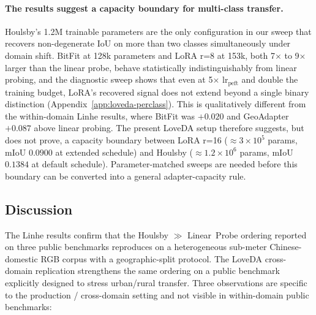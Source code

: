 \paragraph{The results suggest a capacity boundary for multi-class transfer.} Houlsby's 1.2M trainable parameters are the only configuration in our sweep that recovers non-degenerate IoU on more than two classes simultaneously under domain shift. BitFit at 128k parameters and LoRA r=8 at 153k, both 7$\times$ to 9$\times$ larger than the linear probe, behave statistically indistinguishably from linear probing, and the diagnostic sweep shows that even at 5$\times$ lr$_{\mathrm{peft}}$ and double the training budget, LoRA's recovered signal does not extend beyond a single binary distinction (Appendix~\ref{app:loveda-perclass}). This is qualitatively different from the within-domain Linhe results, where BitFit was $+0.020$ and GeoAdapter $+0.087$ above linear probing. The present LoveDA setup therefore suggests, but does not prove, a capacity boundary between LoRA r=16 ($\approx$$3 \times 10^5$ params, mIoU $0.0900$ at extended schedule) and Houlsby ($\approx$$1.2 \times 10^6$ params, mIoU $0.1384$ at default schedule). Parameter-matched sweeps are needed before this boundary can be converted into a general adapter-capacity rule.

\subsection{Discussion}

The Linhe results confirm that the Houlsby $\gg$ Linear~Probe ordering reported on three public benchmarks reproduces on a heterogeneous sub-meter Chinese-domestic RGB corpus with a geographic-split protocol. The LoveDA cross-domain replication strengthens the same ordering on a public benchmark explicitly designed to stress urban/rural transfer. Three observations are specific to the production / cross-domain setting and not visible in within-domain public benchmarks:

